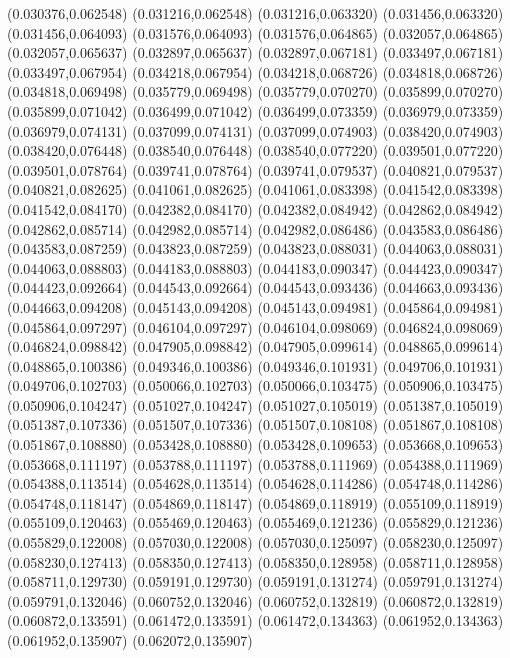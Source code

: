 (0.030376,0.062548)
(0.031216,0.062548)
(0.031216,0.063320)
(0.031456,0.063320)
(0.031456,0.064093)
(0.031576,0.064093)
(0.031576,0.064865)
(0.032057,0.064865)
(0.032057,0.065637)
(0.032897,0.065637)
(0.032897,0.067181)
(0.033497,0.067181)
(0.033497,0.067954)
(0.034218,0.067954)
(0.034218,0.068726)
(0.034818,0.068726)
(0.034818,0.069498)
(0.035779,0.069498)
(0.035779,0.070270)
(0.035899,0.070270)
(0.035899,0.071042)
(0.036499,0.071042)
(0.036499,0.073359)
(0.036979,0.073359)
(0.036979,0.074131)
(0.037099,0.074131)
(0.037099,0.074903)
(0.038420,0.074903)
(0.038420,0.076448)
(0.038540,0.076448)
(0.038540,0.077220)
(0.039501,0.077220)
(0.039501,0.078764)
(0.039741,0.078764)
(0.039741,0.079537)
(0.040821,0.079537)
(0.040821,0.082625)
(0.041061,0.082625)
(0.041061,0.083398)
(0.041542,0.083398)
(0.041542,0.084170)
(0.042382,0.084170)
(0.042382,0.084942)
(0.042862,0.084942)
(0.042862,0.085714)
(0.042982,0.085714)
(0.042982,0.086486)
(0.043583,0.086486)
(0.043583,0.087259)
(0.043823,0.087259)
(0.043823,0.088031)
(0.044063,0.088031)
(0.044063,0.088803)
(0.044183,0.088803)
(0.044183,0.090347)
(0.044423,0.090347)
(0.044423,0.092664)
(0.044543,0.092664)
(0.044543,0.093436)
(0.044663,0.093436)
(0.044663,0.094208)
(0.045143,0.094208)
(0.045143,0.094981)
(0.045864,0.094981)
(0.045864,0.097297)
(0.046104,0.097297)
(0.046104,0.098069)
(0.046824,0.098069)
(0.046824,0.098842)
(0.047905,0.098842)
(0.047905,0.099614)
(0.048865,0.099614)
(0.048865,0.100386)
(0.049346,0.100386)
(0.049346,0.101931)
(0.049706,0.101931)
(0.049706,0.102703)
(0.050066,0.102703)
(0.050066,0.103475)
(0.050906,0.103475)
(0.050906,0.104247)
(0.051027,0.104247)
(0.051027,0.105019)
(0.051387,0.105019)
(0.051387,0.107336)
(0.051507,0.107336)
(0.051507,0.108108)
(0.051867,0.108108)
(0.051867,0.108880)
(0.053428,0.108880)
(0.053428,0.109653)
(0.053668,0.109653)
(0.053668,0.111197)
(0.053788,0.111197)
(0.053788,0.111969)
(0.054388,0.111969)
(0.054388,0.113514)
(0.054628,0.113514)
(0.054628,0.114286)
(0.054748,0.114286)
(0.054748,0.118147)
(0.054869,0.118147)
(0.054869,0.118919)
(0.055109,0.118919)
(0.055109,0.120463)
(0.055469,0.120463)
(0.055469,0.121236)
(0.055829,0.121236)
(0.055829,0.122008)
(0.057030,0.122008)
(0.057030,0.125097)
(0.058230,0.125097)
(0.058230,0.127413)
(0.058350,0.127413)
(0.058350,0.128958)
(0.058711,0.128958)
(0.058711,0.129730)
(0.059191,0.129730)
(0.059191,0.131274)
(0.059791,0.131274)
(0.059791,0.132046)
(0.060752,0.132046)
(0.060752,0.132819)
(0.060872,0.132819)
(0.060872,0.133591)
(0.061472,0.133591)
(0.061472,0.134363)
(0.061952,0.134363)
(0.061952,0.135907)
(0.062072,0.135907)
